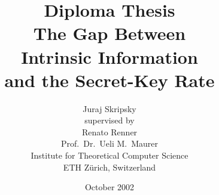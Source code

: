 \documentclass[a4paper, twoside, openany]{report}
\theoremstyle{plain}
\theoremstyle{definition}
\begin{document}
\title{Diploma Thesis\\[4ex]
       \bf The Gap Between \\
           Intrinsic Information \\
           and the Secret-Key Rate}




\author{Juraj Skripsky \\ [10ex]
  supervised by \\[1.2ex]
  Renato Renner \\
  Prof.\ Dr.\ Ueli M.\ Maurer \\[4ex]
  Institute for Theoretical Computer Science\\
  ETH Z\"urich, Switzerland}

\date{October 2002}

\maketitle

\end{document}
